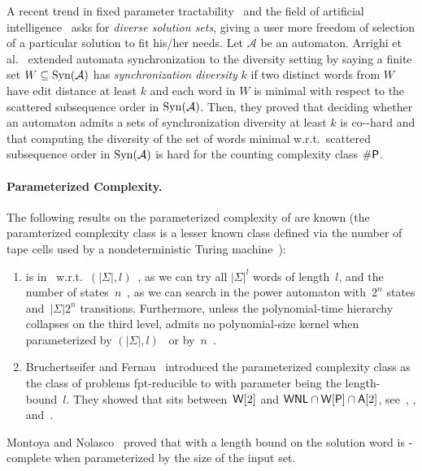 A recent trend in fixed parameter tractability~\cite{DBLP:journals/ai/BasteFJMOPR22}
and the field of artificial intelligence~\cite{DBLP:conf/aaai/HebrardHOW05,DBLP:conf/aaai/IngmarBST20}
asks for \emph{diverse solution sets}, giving a user more freedom of selection of a particular
solution to fit his/her needs.  Let $\mathcal A$ be an automaton.
Arrighi et al.~\cite{DBLP:conf/aaai/ArrighiFO023}
extended automata synchronization to the diversity setting 
by saying a finite set $W \subseteq \operatorname{Syn}(\mathcal A)$
has \emph{synchronization diversity} $k$
if two distinct words from $W$ have edit distance at least $k$ and each word in $W$
is minimal with respect to the scattered subsequence order in $\operatorname{Syn}(\mathcal A)$.
Then, they proved that deciding whether an automaton
admits a sets of synchronization diversity at least $k$
is co-\NP-hard and that computing
the diversity of the set of words minimal w.r.t.~scattered subsequence order
in $\operatorname{Syn}(\mathcal A)$
is hard for the counting complexity class $\# \textup{\textsf{P}}$.

\paragraph{Parameterized Complexity.} 
 The following results on the parameterized complexity of \DFASWS are known (the paramterized complexity class
 \WNL is a lesser known
 class defined via the number of tape cells used
 by a nondeterministic Turing machine~\cite{DBLP:journals/disopt/Guillemot11}):
 
 \begin{enumerate}
 \item \DFASWS is in \FPT\ w.r.t.~$(|\Sigma|, l)$~\cite[Thm.~7]{DBLP:journals/jcss/FernauHV15},
 as we can try all $|\Sigma|^l$ words of length~$l$, 
 and the number of states~$n$~\cite[Thm.~10]{DBLP:journals/jcss/FernauHV15},
 as we can search in the power automaton with~$2^{n}$ states and~$|\Sigma|2^{n}$ transitions.
 Furthermore, unless the polynomial-time hierarchy collapses on the third level,
 \DFASWS admits no polynomial-size kernel
 when parameterized by $(|\Sigma|, l)$~\cite[Cor.~4.6]{DBLP:journals/ita/BruchertseiferF21}
 or by~$n$~\cite{DBLP:journals/dmtcs/VorelR15}.
 	
 \item Bruchertseifer and Fernau~\cite{DBLP:journals/mscs/FernauB22}
 introduced the parameterized complexity class \WSYNC 
 as the class of problems fpt-reducible
 to \DFASWS with parameter being the length-bound~$l$. 
 They showed that \WSYNC 
 sits between~$\textup{\textsf{W}}[2]$ and $\textsf{WNL} \cap \textup{\textsf{W}}[\textsf{P}] \cap \textsf{A}[2]$,
 see~\cite[Thm.~3]{DBLP:journals/jcss/FernauHV15},
 \cite[Thm.~4.2 \& Prop.~4.4]{DBLP:journals/ita/BruchertseiferF21},
 and~\cite[Thm.~3,4 \&~5]{DBLP:journals/mscs/FernauB22}. 
 \end{enumerate}
 Montoya and Nolasco~\cite{MontoyaN17,DBLP:conf/lata/MontoyaN18} 
 proved that \SFS with a length bound on the solution word is \WNL-complete
 when parameterized by the size of the input set.

